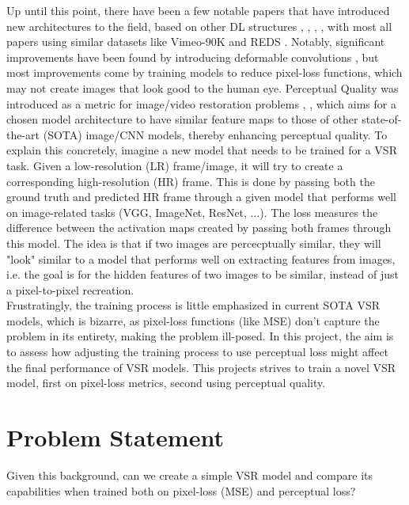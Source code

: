 \documentclass{article}
\begin{document}
Up until this point, there have been a few notable papers that have introduced new architectures to the field, based on other DL structures \cite{chan_basicvsr_2021}, \cite{chan_basicvsr_2022}, \cite{liang_recurrent_nodate}, \cite{rota_enhancing_2023}, with most all papers using similar datasets like Vimeo-90K \cite{xue_video_2019} and REDS \cite{nah_ntire_2021}. Notably, significant improvements have been found by introducing deformable convolutions \cite{dai_deformable_2016}, but most improvements come by training models to reduce pixel-loss functions, which may not create images that look good to the human eye. Perceptual Quality was introduced as a metric for image/video restoration problems \cite{johnson_perceptual_2016}, \cite{zhang_unreasonable_2018}, which aims for a chosen model architecture to have similar feature maps to those of other state-of-the-art (SOTA) image/CNN models, thereby enhancing perceptual quality. To explain this concretely, imagine a new model that needs to be trained for a VSR task. Given a low-resolution (LR) frame/image, it will try to create a corresponding high-resolution (HR) frame.  This is done by passing both the ground truth and predicted HR frame through a given model that performs well on image-related tasks (VGG, ImageNet, ResNet, ...). The loss measures the difference between the activation maps created by passing both frames through this model. The idea is that if two images are percecptually similar, they will "look" similar to a model that performs well on extracting features from images, i.e. the goal is for the hidden features of two images to be similar, instead of just a pixel-to-pixel recreation. \\

Frustratingly, the training process is little emphasized in current SOTA VSR models, which is bizarre, as pixel-loss functions (like MSE) don’t capture the problem in its entirety, making the problem ill-posed. In this project, the aim is to assess how adjusting the training process to use perceptual loss might affect the final performance of VSR models. This projects strives to train a novel VSR model, first on pixel-loss metrics, second using perceptual quality. \\ 

\section{Problem Statement}

Given this background, can we create a simple VSR model and compare its capabilities when trained both on pixel-loss (MSE) and perceptual loss?
\end{document}
